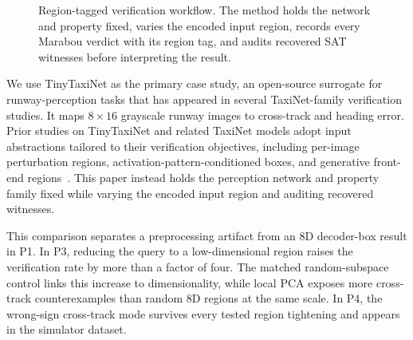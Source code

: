 \documentclass[twocolumn,smallextended,runningheads]{svjour3}
\begin{document}
\begin{figure}[t]
\centering
{}
\caption{Region-tagged verification workflow. The method holds the network and property fixed, varies the encoded input region, records every Marabou verdict with its region tag, and audits recovered SAT witnesses before interpreting the result.}
\label{fig:workflow}
\end{figure}

We use TinyTaxiNet as the primary case study, an open-source surrogate for runway-perception tasks that has appeared in several TaxiNet-family verification studies. It maps $8 \times 16$ grayscale runway images to cross-track and heading error. Prior studies on TinyTaxiNet and related TaxiNet models adopt input abstractions tailored to their verification objectives, including per-image perturbation regions, activation-pattern-conditioned boxes, and generative front-end regions~\cite{wu2020,kadron2021,katz2022}. This paper instead holds the perception network and property family fixed while varying the encoded input region and auditing recovered witnesses.

This comparison separates a preprocessing artifact from an 8D decoder-box result in P1. In P3, reducing the query to a low-dimensional region raises the verification rate by more than a factor of four. The matched random-subspace control links this increase to dimensionality, while local PCA exposes more cross-track counterexamples than random 8D regions at the same scale. In P4, the wrong-sign cross-track mode survives every tested region tightening and appears in the simulator dataset.
\end{document}
